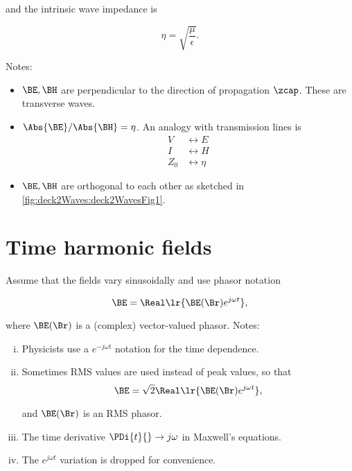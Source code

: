 and the intrinsic wave impedance is

\begin{equation}\label{eqn:uwavesLecture2:640}
\eta = \sqrt{\frac{\mu}{\epsilon}}.
\end{equation}

Notes:

\begin{itemize}
\item \( \BE, \BH \) are perpendicular to the direction of propagation \( \zcap \).  These are transverse waves.
\item \( \Abs{\BE}/\Abs{\BH} = \eta \).  An analogy with transmission lines is
\begin{equation}\label{eqn:uwavesLecture2:660}
\begin{aligned}
V &\leftrightarrow E \\
I &\leftrightarrow H \\
Z_0 &\leftrightarrow \eta
\end{aligned}
\end{equation}
\item \( \BE, \BH \) are orthogonal to each other as sketched in \cref{fig:deck2Waves:deck2WavesFig1}.

\end{itemize}

\section{Time harmonic fields}

Assume that the fields vary sinusoidally and use phasor notation

\begin{equation}\label{eqn:uwavesLecture2:680}
\BE = \Real\lr{ \BE(\Br) e^{j \omega t} },
\end{equation}

where \( \BE(\Br) \) is a (complex) vector-valued phasor.  Notes:

\begin{enumerate}[(i)]
\item Physicists use a \( e^{-j \omega t} \) notation for the time dependence.
\item Sometimes RMS values are used instead of peak values, so that
\begin{equation}\label{eqn:uwavesLecture2:700}
\BE = \sqrt{2} \Real\lr{ \BE(\Br) e^{j \omega t} },
\end{equation}

and \( \BE(\Br) \) is an RMS phasor.
\item The time derivative \( \PDi{t}{} \rightarrow j\omega \) in Maxwell's equations.
\item The \( e^{j \omega t} \) variation is dropped for convenience.
\end{enumerate}

